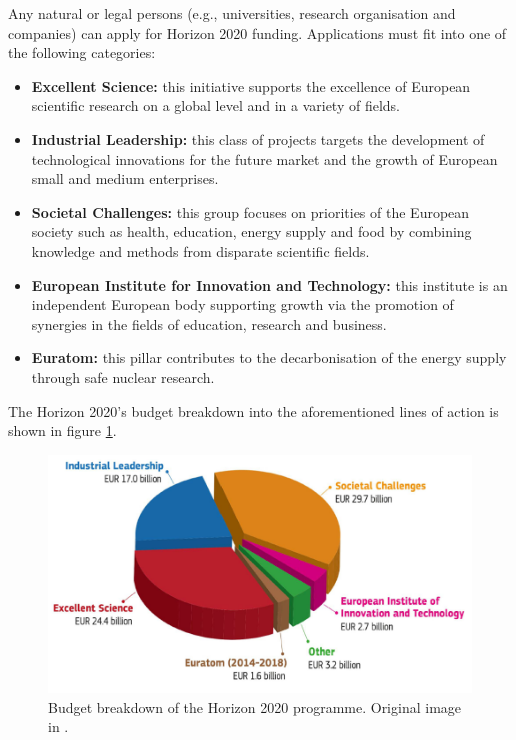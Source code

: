 
Any natural or legal persons (e.g., universities, research organisation and companies) can apply for Horizon 2020 funding. Applications must fit into one of the following categories: 

\begin{itemize}
 \item \textbf{Excellent Science:} this initiative supports the excellence of European scientific research on a global level and in a variety of fields.
 \item \textbf{Industrial Leadership:} this class of projects targets the development of technological innovations for the future market and the growth of European small and medium enterprises.
 \item \textbf{Societal Challenges:} this group focuses on priorities of the European society such as health, education, energy supply and food by combining knowledge and methods from disparate scientific fields.  
 \item \textbf{European Institute for Innovation and Technology:} this institute is an independent European body supporting growth via the promotion of synergies in the fields of education, research and business. 
 \item \textbf{Euratom:} this pillar contributes to the decarbonisation of the energy supply through safe nuclear research.
\end{itemize}
The Horizon 2020's budget breakdown into the aforementioned lines of action is shown in figure \ref{H2020_budget_breakdown}.

\begin{figure}[!t] 
 \begin{center}
 \includegraphics[scale=0.3]{Images/H2020_budget_breakdown.png}
 \caption{Budget breakdown of the Horizon 2020 programme. Original image in \cite{OECD}.}
 \label{H2020_budget_breakdown}
 \end{center}
\end{figure}

